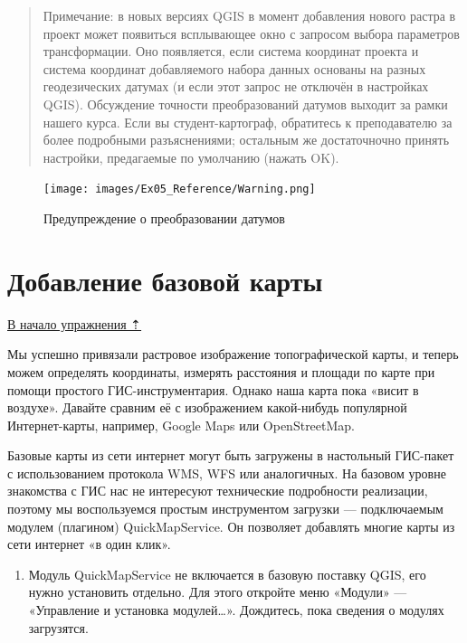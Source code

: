 \documentclass[
  12pt,
]{book}
\providecommand{\tightlist}{%
  \setlength{\itemsep}{0pt}\setlength{\parskip}{0pt}}
\begin{document}
\begin{enumerate}
  \begin{quote}
  Примечание: в новых версиях QGIS в момент добавления нового растра в проект может появиться всплывающее окно с запросом выбора параметров трансформации. Оно появляется, если система координат проекта и система координат добавляемого набора данных основаны на разных геодезических датумах (и если этот запрос не отключён в настройках QGIS). Обсуждение точности преобразований датумов выходит за рамки нашего курса. Если вы студент-картограф, обратитесь к преподавателю за более подробными разъяснениями; остальным же достаточночно принять настройки, предагаемые по умолчанию (нажать OK).
  \end{quote}

  \begin{figure}
  \centering
  \texttt{[image: images/Ex05\_Reference/Warning.png]}
  \caption{Предупреждение о преобразовании датумов}
  \end{figure}
\end{enumerate}

\hypertarget{raster-reference-basemap}{%
\section{Добавление базовой карты}\label{raster-reference-basemap}}

\protect\hyperlink{raster-reference}{В начало упражнения ⇡}

Мы успешно привязали растровое изображение топографической карты, и теперь можем определять координаты, измерять расстояния и площади по карте при помощи простого ГИС-инструментария. Однако наша карта пока «висит в воздухе». Давайте сравним её с изображением какой-нибудь популярной Интернет-карты, например, Google Maps или OpenStreetMap.

Базовые карты из сети интернет могут быть загружены в настольный ГИС-пакет с использованием протокола WMS, WFS или аналогичных. На базовом уровне знакомства с ГИС нас не интересуют технические подробности реализации, поэтому мы воспользуемся простым инструментом загрузки --- подключаемым модулем (плагином) QuickMapService. Он позволяет добавлять многие карты из сети интернет «в один клик».

\begin{enumerate}
\def\labelenumi{\arabic{enumi}.}
\tightlist
\item
  Модуль QuickMapService не включается в базовую поставку QGIS, его нужно установить отдельно. Для этого откройте меню «Модули» --- «Управление и установка модулей\ldots». Дождитесь, пока сведения о модулях загрузятся.
\end{enumerate}
\end{document}
